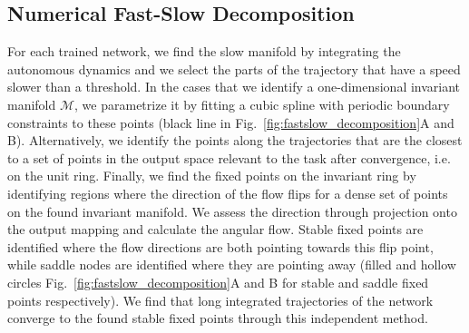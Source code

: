 \documentclass{article} %
\newcounter{ct}
\newcommand{\manifold}{\mathcal{M}}
\theoremstyle{definition}
\theoremstyle{remark}
\begin{document}
\subsection{Numerical Fast-Slow Decomposition}\label{sec:fastslowmethod}
For each trained network, we find the slow manifold by integrating the autonomous dynamics and we select the parts of the trajectory that have a speed slower than a threshold.
%
In the cases that we identify a one-dimensional invariant manifold \(\manifold\), we parametrize it by fitting a cubic spline with periodic boundary constraints to these points (black line in Fig.~\ref{fig:fastslow_decomposition}A and B).
Alternatively, we identify the points along the trajectories that are the closest to a set of points in the output space relevant to the task after convergence, i.e. on the unit ring.
Finally, we find the fixed points on the invariant ring by identifying regions where the direction of the flow flips for a dense set of points on the found invariant manifold.
We assess the direction through projection onto the output mapping and calculate the angular flow.
Stable fixed points are identified where the flow directions are both pointing towards this flip point,
while saddle nodes are identified where they are pointing away (filled and hollow circles Fig.~\ref{fig:fastslow_decomposition}A and B for stable and saddle fixed points respectively).
We find that long integrated trajectories of the network converge to the found stable fixed points through this independent method.
\end{document}
